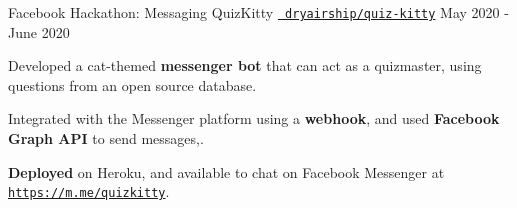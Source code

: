 \begin{cventries}
  \cventry
  {Facebook Hackathon: Messaging}
  {QuizKitty}
  {\texttt{\href{https://github.com/dryairship/quiz-kitty}{\faGithub{} dryairship/quiz-kitty}}}
  {May 2020 - June 2020}
  {
    \begin{cvitems}
      \item Developed a cat-themed \textbf{messenger bot} that can act as a quizmaster, using questions from an open source database.
      \item Integrated with the Messenger platform using a \textbf{webhook}, and used \textbf{Facebook Graph API} to send messages,.
      \item \textbf{Deployed} on Heroku, and available to chat on Facebook Messenger at \texttt{\href{https://m.me/quizkitty}{https://m.me/quizkitty}}.
    \end{cvitems}
  }
\end{cventries}
\vspace{-2mm}
